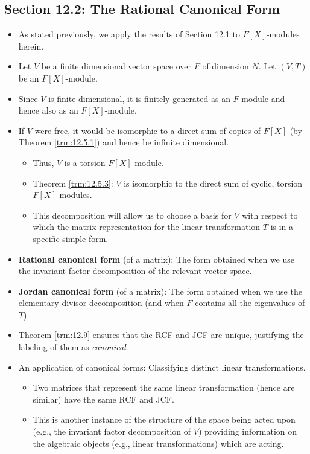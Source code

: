 \documentclass[../notes.tex]{subfiles}
\begin{document}
\subsection*{Section 12.2: The Rational Canonical Form}
\begin{itemize}
    \item As stated previously, we apply the results of Section 12.1 to $F[X]$-modules herein.
    \item Let $V$ be a finite dimensional vector space over $F$ of dimension $N$. Let $(V,T)$ be an $F[X]$-module.
    \item Since $V$ is finite dimensional, it is finitely generated as an $F$-module and hence also as an $F[X]$-module.
    \item If $V$ were free, it would be isomorphic to a direct sum of copies of $F[X]$ (by Theorem \ref{trm:12.5.1}) and hence be infinite dimensional.
    \begin{itemize}
        \item Thus, $V$ is a torsion $F[X]$-module.
        \item Theorem \ref{trm:12.5.3}: $V$ is isomorphic to the direct sum of cyclic, torsion $F[X]$-modules.
        \item This decomposition will allow us to choose a basis for $V$ with respect to which the matrix representation for the linear transformation $T$ is in a specific simple form.
    \end{itemize}
    \item \textbf{Rational canonical form} (of a matrix): The form obtained when we use the invariant factor decomposition of the relevant vector space.
    \item \textbf{Jordan canonical form} (of a matrix): The form obtained when we use the elementary divisor decomposition (and when $F$ contains all the eigenvalues of $T$).
    \item Theorem \ref{trm:12.9} ensures that the RCF and JCF are unique, justifying the labeling of them as \emph{canonical}.
    \item An application of canonical forms: Classifying distinct linear transformations.
    \begin{itemize}
        \item Two matrices that represent the same linear transformation (hence are similar) have the same RCF and JCF.
        \item This is another instance of the structure of the space being acted upon (e.g., the invariant factor decomposition of $V$) providing information on the algebraic objects (e.g., linear transformations) which are acting.

\end{itemize}
\end{itemize}
\end{document}
